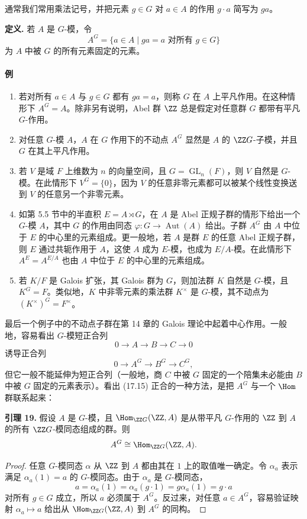 通常我们常用乘法记号，并把元素 $g\in G$ 对 $a\in A$ 的作用 $g\cdot a$ 简写为 $ga$。

\noindent\textbf{定义.} 若 $A$ 是 $G$-模，令
\[
  A^G=\{a\in A\mid ga=a\text{ 对所有 }g\in G\}
\]
为 $A$ 中被 $G$ 的所有元素固定的元素。

\paragraph{例}
\begin{enumerate}[label=(\arabic*)]
  \item 若对所有 $a\in A$ 与 $g\in G$ 都有 $ga=a$，则称 $G$ 在 $A$ 上平凡作用。在这种情形下 $A^G=A$。除非另有说明，Abel 群 $\ZZ$ 总是假定对任意群 $G$ 都带有平凡 $G$-作用。
  \item 对任意 $G$-模 $A$，$A$ 在 $G$ 作用下的不动点 $A^G$ 显然是 $A$ 的 $\ZZ G$-子模，并且 $G$ 在其上平凡作用。
  \item 若 $V$ 是域 $F$ 上维数为 $n$ 的向量空间，且 $G=\operatorname{GL}_n(F)$，则 $V$ 自然是 $G$-模。在此情形下 $V^G=\{0\}$，因为 $V$ 的任意非零元素都可以被某个线性变换送到 $V$ 的任意另一个非零元素。
  \item 如第 5.5 节中的半直积 $E=A\rtimes G$，在 $A$ 是 Abel 正规子群的情形下给出一个 $G$-模 $A$，其中 $G$ 的作用由同态 $\varphi:G\to\operatorname{Aut}(A)$ 给出。子群 $A^G$ 由 $A$ 中位于 $E$ 的中心里的元素组成。更一般地，若 $A$ 是群 $E$ 的任意 Abel 正规子群，则 $E$ 通过共轭作用于 $A$，这使 $A$ 成为 $E$-模，也成为 $E/A$-模。在此情形下 $A^E=A^{E/A}$ 也由 $A$ 中位于 $E$ 的中心里的元素组成。
  \item 若 $K/F$ 是 Galois 扩张，其 Galois 群为 $G$，则加法群 $K$ 自然是 $G$-模，且 $K^G=F$。类似地，$K$ 中非零元素的乘法群 $K^\times$ 是 $G$-模，其不动点为 $(K^\times)^G=F^\times$。
\end{enumerate}

最后一个例子中的不动点子群在第 14 章的 Galois 理论中起着中心作用。一般地，容易看出 $G$-模短正合列
\[
  0\to A\to B\to C\to0
\]
诱导正合列
\[
  0\to A^G\to B^G\to C^G,
  \tag{17.15}
\]
但它一般不能延伸为短正合列（一般地，商 $C$ 中被 $G$ 固定的一个陪集未必能由 $B$ 中被 $G$ 固定的元素表示）。看出 (17.15) 正合的一种方法，是把 $A^G$ 与一个 $\Hom$ 群联系起来：

\medskip
\noindent\textbf{引理 19.} 假设 $A$ 是 $G$-模，且 $\Hom_{\ZZ G}(\ZZ,A)$ 是从带平凡 $G$-作用的 $\ZZ$ 到 $A$ 的所有 $\ZZ G$-模同态组成的群。则
\[
  A^G\cong\Hom_{\ZZ G}(\ZZ,A).
\]

\begin{proof}
任意 $G$-模同态 $\alpha$ 从 $\ZZ$ 到 $A$ 都由其在 $1$ 上的取值唯一确定。令 $\alpha_a$ 表示满足 $\alpha_a(1)=a$ 的 $G$-模同态。由于 $\alpha_a$ 是 $G$-模同态，
\[
  a=\alpha_a(1)=\alpha_a(g\cdot1)=g\alpha_a(1)=g\cdot a
\]
对所有 $g\in G$ 成立，所以 $a$ 必须属于 $A^G$。反过来，对任意 $a\in A^G$，容易验证映射 $\alpha_a\mapsto a$ 给出从 $\Hom_{\ZZ G}(\ZZ,A)$ 到 $A^G$ 的同构。
\end{proof}


